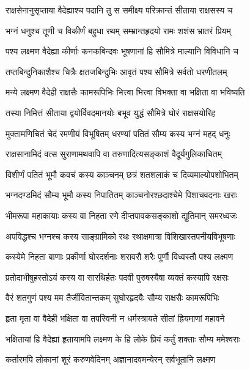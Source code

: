 \twolineshloka
{राक्षसेनानुसृप्ताया वैदेह्याश्च पदानि तु}
{स समीक्ष्य परिक्रान्तं सीताया राक्षसस्य च} %

\twolineshloka
{भग्नं धनुश्च तूणी च विकीर्णं बहुधा रथम्}
{सम्भ्रान्तहृदयो रामः शशंस भ्रातरं प्रियम्} %

\twolineshloka
{पश्य लक्ष्मण वैदेह्या कीर्णाः कनकबिन्दवः}
{भूषणानां हि सौमित्रे माल्यानि विविधानि च} %

\twolineshloka
{तप्तबिन्दुनिकाशैश्च चित्रैः क्षतजबिन्दुभिः}
{आवृतं पश्य सौमित्रे सर्वतो धरणीतलम्} %

\twolineshloka
{मन्ये लक्ष्मण वैदेही राक्षसैः कामरूपिभिः}
{भित्त्वा भित्त्वा विभक्ता वा भक्षिता वा भविष्यति} %

\twolineshloka
{तस्या निमित्तं सीताया द्वयोर्विवदमानयोः}
{बभूव युद्धं सौमित्रे घोरं राक्षसयोरिह} %

\twolineshloka
{मुक्तामणिचितं चेदं रमणीयं विभूषितम्}
{धरण्यां पतितं सौम्य कस्य भग्नं महद् धनुः} %

\twolineshloka
{राक्षसानामिदं वत्स सुराणामथवापि वा}
{तरुणादित्यसङ्काशं वैदूर्यगुलिकाचितम्} %

\twolineshloka
{विशीर्णं पतितं भूमौ कवचं कस्य काञ्चनम्}
{छत्रं शतशलाकं च दिव्यमाल्योपशोभितम्} %

\twolineshloka
{भग्नदण्डमिदं सौम्य भूमौ कस्य निपातितम्}
{काञ्चनोरश्छदाश्चेमे पिशाचवदनाः खराः} %

\twolineshloka
{भीमरूपा महाकायाः कस्य वा निहता रणे}
{दीप्तपावकसङ्काशो द्युतिमान् समरध्वजः} %

\twolineshloka
{अपविद्धश्च भग्नश्च कस्य साङ्ग्रामिको रथः}
{रथाक्षमात्रा विशिखास्तपनीयविभूषणाः} %

\twolineshloka
{कस्येमे निहता बाणाः प्रकीर्णा घोरदर्शनाः}
{शरावरौ शरैः पूर्णौ विध्वस्तौ पश्य लक्ष्मण} %

\twolineshloka
{प्रतोदाभीषुहस्तोऽयं कस्य वा सारथिर्हतः}
{पदवी पुरुषस्यैषा व्यक्तं कस्यापि रक्षसः} %

\twolineshloka
{वैरं शतगुणं पश्य मम तैर्जीवितान्तकम्}
{सुघोरहृदयैः सौम्य राक्षसैः कामरूपिभिः} %

\twolineshloka
{हृता मृता वा वैदेही भक्षिता वा तपस्विनी}
{न धर्मस्त्रायते सीतां ह्रियमाणां महावने} %

\twolineshloka
{भक्षितायां हि वैदेह्यां हृतायामपि लक्ष्मण}
{के हि लोके प्रियं कर्तुं शक्ताः सौम्य ममेश्वराः} %

\twolineshloka
{कर्तारमपि लोकानां शूरं करुणवेदिनम्}
{अज्ञानादवमन्येरन् सर्वभूतानि लक्ष्मण} %


